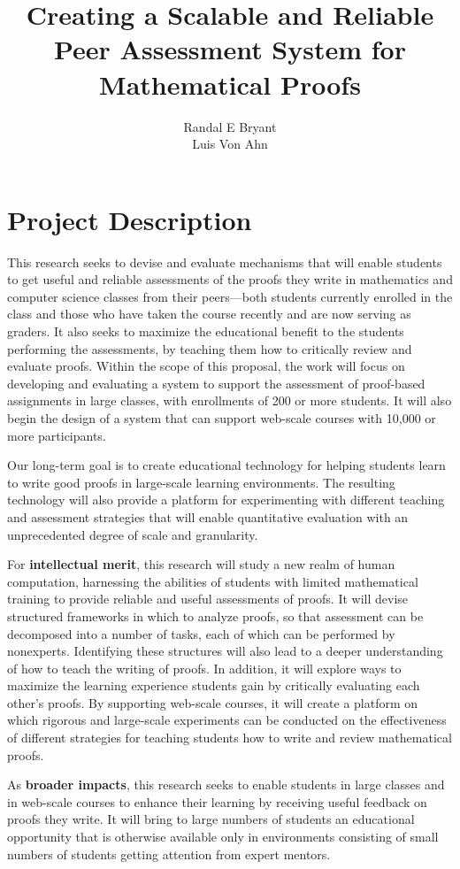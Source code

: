 \documentclass[12pt]{article}
\title{Creating a Scalable and Reliable Peer Assessment System for
  Mathematical Proofs}
\author{Randal E Bryant \\ Luis Von Ahn}
\begin{document}
\section*{Project Description}

This research seeks to devise and evaluate mechanisms that will enable
students to get useful and reliable assessments of the proofs they
write in mathematics and computer science classes from their
peers---both students currently enrolled in the class and those who
have taken the course recently and are now serving as graders.  It
also seeks to maximize the educational benefit to the students
performing the assessments, by teaching them how to critically review
and evaluate proofs.  Within the scope of this proposal, the work will
focus on developing and evaluating a system to support the assessment
of proof-based assignments in large classes, with enrollments of 200
or more students.  It will also begin the design of a
system that can support web-scale courses with 10,000 or more
participants.

Our long-term goal is to create educational technology for helping
students learn to write good proofs in large-scale learning
environments.  The resulting technology will also provide a platform
for experimenting with different teaching and assessment strategies
that will enable quantitative evaluation with an unprecedented
degree of scale and granularity.

For {\bf intellectual merit}, this research will study a new realm of
human computation, harnessing the abilities of students with limited
mathematical training to provide reliable and useful assessments of
proofs.  It will devise structured frameworks in which to analyze
proofs, so that assessment can be decomposed into a number of tasks,
each of which can be performed by nonexperts.  Identifying these
structures will also lead to a deeper understanding of how to teach
the writing of proofs.  In addition, it will explore ways to maximize
the learning experience students gain by critically evaluating each
other's proofs.  By supporting web-scale courses, it will create a
platform on which rigorous and large-scale experiments can be
conducted on the effectiveness of different strategies for teaching
students how to write and review mathematical proofs.

As {\bf broader impacts}, this research seeks to enable students in
large classes and in web-scale courses to enhance their learning by
receiving useful feedback on proofs they write.  It will bring to
large numbers of students an educational opportunity that is otherwise
available only in environments consisting of small numbers of students
getting attention from expert mentors.  
\end{document}
